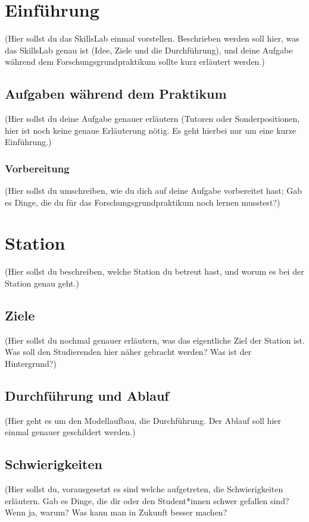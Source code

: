 \documentclass[11pt,a4paper,titlepage]{article}
\begin{document}
\newpage
\section{Einführung} 
\label{sec:introduction}

(Hier sollst du das SkillsLab einmal vorstellen. Beschrieben werden soll hier, was das SkillsLab genau ist (Idee, Ziele und die Durchführung),  und deine Aufgabe während dem Forschungsgrundpraktikum sollte kurz erläutert werden.)
\newpage
\subsection{Aufgaben während dem Praktikum}
\label{sec:litrev}
(Hier sollst du deine Aufgabe genauer erläutern (Tutoren oder Sonderpositionen, hier ist noch keine genaue Erläuterung nötig. Es geht hierbei nur um eine kurze Einführung.)

\subsubsection{Vorbereitung}
(Hier sollst du umschreiben, wie du dich auf deine Aufgabe vorbereitet hast; Gab es Dinge, die du für das Forschungsgrundpraktikum noch lernen musstest?)
\newpage
\section{Station}
(Hier sollst du beschreiben, welche Station du betreut hast, und worum es bei der Station genau geht.)
\subsection{Ziele}
(Hier sollst du nochmal genauer erläutern, was das eigentliche Ziel der Station ist. Was soll den Studierenden hier näher gebracht werden? Was ist der Hintergrund?)
\subsection{Durchführung und Ablauf}
(Hier geht es um den Modellaufbau, die Durchführung. Der Ablauf soll hier einmal genauer geschildert werden.)
\subsection{Schwierigkeiten}
(Hier sollst du, vorausgesetzt es sind welche aufgetreten, die Schwierigkeiten erläutern. Gab es Dinge, die dir oder den Student*innen schwer gefallen sind? Wenn ja, warum? Was kann man in Zukunft besser machen?
\end{document}
